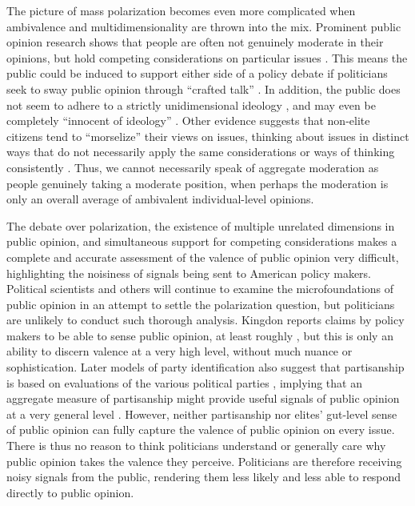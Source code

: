 The picture of mass polarization becomes even more complicated when ambivalence and multidimensionality are thrown into the mix. Prominent public opinion research shows that people are often not genuinely moderate in their opinions, but hold competing considerations on particular issues \citep{Zaller1992a,Zaller1992b,Hochschild1981}. This means the public could be induced to support either side of a policy debate if politicians seek to sway public opinion through ``crafted talk'' \citep{Jacobs2000}. In addition, the public does not seem to adhere to a strictly unidimensional ideology \citep{Treier2009}, and may even be completely ``innocent of ideology'' \citep{Converse1964}. Other evidence suggests that non-elite citizens tend to ``morselize'' their views on issues, thinking about issues in distinct ways that do not necessarily apply the same considerations or ways of thinking consistently \citep{Kinder1983,Lane1962}. Thus, we cannot necessarily speak of aggregate moderation as people genuinely taking a moderate position, when perhaps the moderation is only an overall average of ambivalent individual-level opinions.

The debate over polarization, the existence of multiple unrelated dimensions in public opinion, and simultaneous support for competing considerations makes a complete and accurate assessment of the valence of public opinion very difficult, highlighting the noisiness of signals being sent to American policy makers. Political scientists and others will continue to examine the microfoundations of public opinion in an attempt to settle the polarization question, but politicians are unlikely to conduct such thorough analysis. Kingdon reports claims by policy makers to be able to sense public opinion, at least roughly \citep{Kingdon1995}, but this is only an ability to discern valence at a very high level, without much nuance or sophistication. Later models of party identification also suggest that partisanship is based on evaluations of the various political parties \citep{Fiorina1984,Johnston2006}, implying that an aggregate measure of partisanship might provide useful signals of public opinion at a very general level \citep{MacKuen1989}. However, neither partisanship nor elites' gut-level sense of public opinion can fully capture the valence of public opinion on every issue. There is thus no reason to think politicians understand or generally care why public opinion takes the valence they perceive. Politicians are therefore receiving noisy signals from the public, rendering them less likely and less able to respond directly to public opinion.


